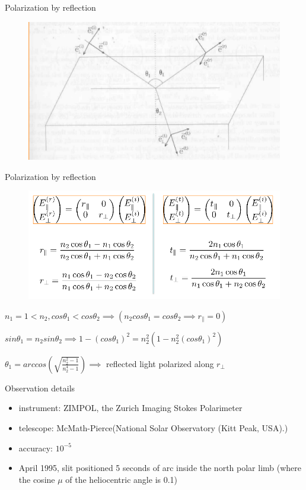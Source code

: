\documentclass{beamer}
\begin{document}
\begin{frame}{Polarization by reflection}
	\begin{figure}[H]
 \centering
 \includegraphics[scale=0.5]{a5.png}
\end{figure}
\end{frame}


\begin{frame}{Polarization by reflection}
\begin{figure}[H]
 \centering
 \includegraphics[scale=0.5]{a6.png}
\end{figure}
$n_1 = 1 < n_2, cos \theta_1 < cos \theta_2 \implies ( n_2 cos \theta_1 = cos \theta_2 \implies r_{\parallel} = 0) $

$sin \theta_1 = n_2 sin \theta_2 \implies 1 - (cos \theta_1)^2 = n_2^2 (1 - n_2^2 (cos \theta_1)^2) $

$ \theta_1 = arccos (\sqrt{\frac{n_2^2 -1}{n_2^4-1}}) \implies  $ reflected light polarized along $r_{\perp}$
\end{frame}
\begin{frame}{Observation details}
\begin{itemize}

\item instrument: ZIMPOL, the Zurich Imaging Stokes Polarimeter 
\item telescope: McMath-Pierce(National Solar Observatory (Kitt Peak, USA).)
\item accuracy: $10^{-5}$
\item April 1995, slit positioned 5 seconds of arc inside the north polar limb 
(where the cosine $\mu$ of the heliocentric angle is 0.1)
\end{itemize}
\end{frame}
\end{document}
